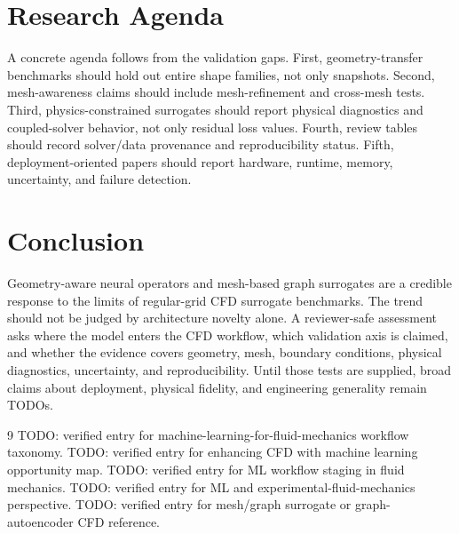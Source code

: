 \documentclass[11pt]{article}
\begin{document}
\section{Research Agenda}
A concrete agenda follows from the validation gaps. First, geometry-transfer benchmarks should hold out entire shape families, not only snapshots. Second, mesh-awareness claims should include mesh-refinement and cross-mesh tests. Third, physics-constrained surrogates should report physical diagnostics and coupled-solver behavior, not only residual loss values. Fourth, review tables should record solver/data provenance and reproducibility status. Fifth, deployment-oriented papers should report hardware, runtime, memory, uncertainty, and failure detection.

\section{Conclusion}
Geometry-aware neural operators and mesh-based graph surrogates are a credible response to the limits of regular-grid CFD surrogate benchmarks. The trend should not be judged by architecture novelty alone. A reviewer-safe assessment asks where the model enters the CFD workflow, which validation axis is claimed, and whether the evidence covers geometry, mesh, boundary conditions, physical diagnostics, uncertainty, and reproducibility. Until those tests are supplied, broad claims about deployment, physical fidelity, and engineering generality remain TODOs.

\begin{thebibliography}{9}
 TODO: verified entry for machine-learning-for-fluid-mechanics workflow taxonomy.
 TODO: verified entry for enhancing CFD with machine learning opportunity map.
 TODO: verified entry for ML workflow staging in fluid mechanics.
 TODO: verified entry for ML and experimental-fluid-mechanics perspective.
 TODO: verified entry for mesh/graph surrogate or graph-autoencoder CFD reference.
\end{thebibliography}
\end{document}
